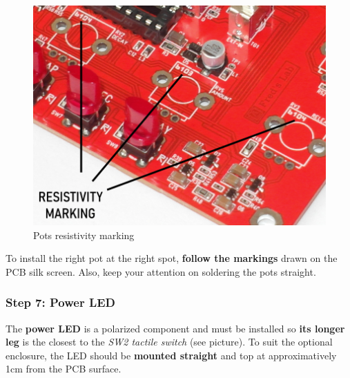 \documentclass{scrartcl}
\begin{document}
\begin{figure}[!ht]
    \begin{center}
        \includegraphics[scale=0.32]{assets/pots-marking.jpg}
        \caption{Pots resistivity marking}
    \end{center}
\end{figure}

To install the right pot at the right spot, \textbf{follow the markings} drawn on the PCB silk screen.
Also, keep your attention on soldering the pots straight.

\pagebreak

\subsubsection{Step 7: Power LED}

The \textbf{power LED} is a polarized component and must be installed so \textbf{its longer leg} is the closest to the \emph{SW2 tactile switch} (see picture).
To suit the optional enclosure, the LED should be \textbf{mounted straight} and top at approximatively 1cm from the PCB surface.
\end{document}
